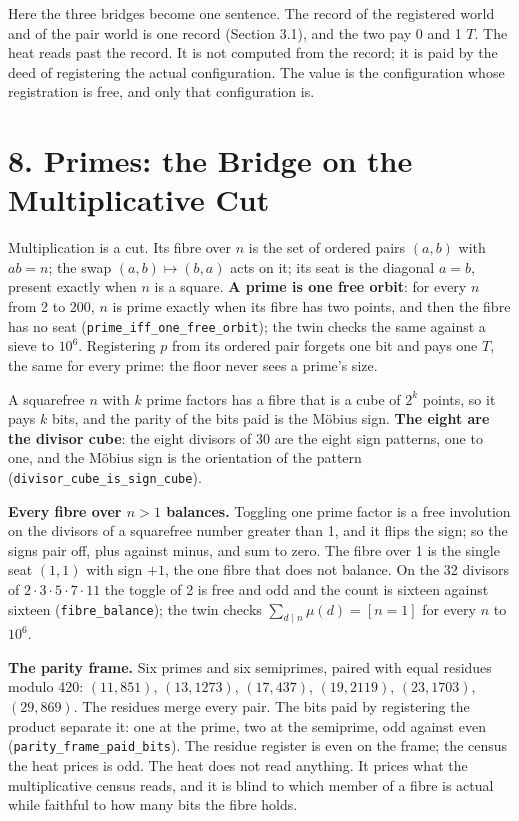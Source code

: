 \documentclass[10pt,twocolumn]{article}
\begin{document}
Here the three bridges become one sentence. The record of the registered
world and of the pair world is one record (Section 3.1), and the two pay
0 and 1 \(T\). The heat reads past the record. It is not computed from
the record; it is paid by the deed of registering the actual
configuration. The value is the configuration whose registration is
free, and only that configuration is.

\hypertarget{primes-the-bridge-on-the-multiplicative-cut}{%
\section{8. Primes: the Bridge on the Multiplicative
Cut}\label{primes-the-bridge-on-the-multiplicative-cut}}

Multiplication is a cut. Its fibre over \(n\) is the set of ordered
pairs \((a,b)\) with \(ab=n\); the swap \((a,b)\mapsto(b,a)\) acts on
it; its seat is the diagonal \(a=b\), present exactly when \(n\) is a
square. \textbf{A prime is one free orbit}: for every \(n\) from 2 to
200, \(n\) is prime exactly when its fibre has two points, and then the
fibre has no seat (\texttt{prime\_\allowbreak{}iff\_\allowbreak{}one\_\allowbreak{}free\_\allowbreak{}orbit}); the twin
checks the same against a sieve to \(10^6\). Registering \(p\) from its
ordered pair forgets one bit and pays one \(T\), the same for every
prime: the floor never sees a prime's size.

A squarefree \(n\) with \(k\) prime factors has a fibre that is a cube
of \(2^k\) points, so it pays \(k\) bits, and the parity of the bits
paid is the Möbius sign. \textbf{The eight are the divisor cube}: the
eight divisors of 30 are the eight sign patterns, one to one, and the
Möbius sign is the orientation of the pattern
(\texttt{divisor\_\allowbreak{}cube\_\allowbreak{}is\_\allowbreak{}sign\_\allowbreak{}cube}).

\textbf{Every fibre over \(n>1\) balances.} Toggling one prime factor is
a free involution on the divisors of a squarefree number greater than 1,
and it flips the sign; so the signs pair off, plus against minus, and
sum to zero. The fibre over 1 is the single seat \((1,1)\) with sign
\(+1\), the one fibre that does not balance. On the 32 divisors of
\(2\cdot3\cdot5\cdot7\cdot11\) the toggle of 2 is free and odd and the
count is sixteen against sixteen (\texttt{fibre\_\allowbreak{}balance}); the twin
checks \(\sum_{d\mid n}\mu(d)=[n=1]\) for every \(n\) to \(10^6\).

\textbf{The parity frame.} Six primes and six semiprimes, paired with
equal residues modulo 420: \((11,851)\), \((13,1273)\), \((17,437)\),
\((19,2119)\), \((23,1703)\), \((29,869)\). The residues merge every
pair. The bits paid by registering the product separate it: one at the
prime, two at the semiprime, odd against even
(\texttt{parity\_\allowbreak{}frame\_\allowbreak{}paid\_\allowbreak{}bits}). The residue register is even on
the frame; the census the heat prices is odd. The heat does not read
anything. It prices what the multiplicative census reads, and it is
blind to which member of a fibre is actual while faithful to how many
bits the fibre holds.
\end{document}
